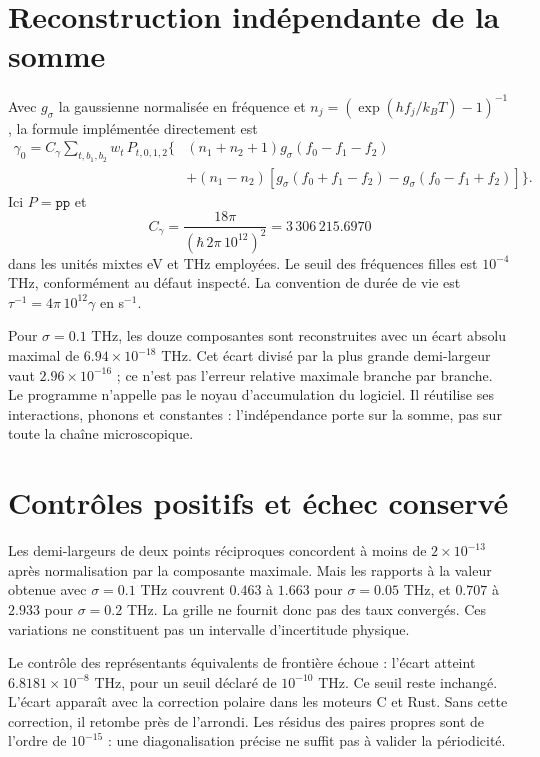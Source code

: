 \documentclass[11pt,a4paper]{article}
\begin{document}
\section{Reconstruction indépendante de la somme}
Avec $g_\sigma$ la gaussienne normalisée en fréquence et
$n_j=(\exp(hf_j/k_BT)-1)^{-1}$, la formule implémentée directement est
\[
\begin{split}
\gamma_0=C_\gamma\sum_{t,b_1,b_2}w_t\,P_{t,0,1,2}
\bigl\{&(n_1+n_2+1)g_\sigma(f_0-f_1-f_2)\\
&+(n_1-n_2)[g_\sigma(f_0+f_1-f_2)
-g_\sigma(f_0-f_1+f_2)]\bigr\}.
\end{split}
\]
Ici $P=\texttt{pp}$ et
\[
 C_\gamma=\frac{18\pi}{(\hbar\,2\pi\,10^{12})^2}
 =3\,306\,215.6970
\]
dans les unités mixtes eV et THz employées. Le seuil des fréquences
filles est $10^{-4}$ THz, conformément au défaut inspecté.
La convention de durée de vie est
$\tau^{-1}=4\pi\,10^{12}\gamma$ en s$^{-1}$.

Pour $\sigma=0.1$ THz, les douze composantes sont reconstruites avec un
écart absolu maximal de $6.94\times10^{-18}$ THz.
Cet écart divisé par la plus grande demi-largeur vaut $2.96\times10^{-16}$ ;
ce n'est pas l'erreur relative maximale branche par branche.
Le programme n'appelle pas le noyau d'accumulation du logiciel.
Il réutilise ses interactions, phonons et constantes : l'indépendance
porte sur la somme, pas sur toute la chaîne microscopique.

\section{Contrôles positifs et échec conservé}
Les demi-largeurs de deux points réciproques concordent à moins de
$2\times10^{-13}$ après normalisation par la composante maximale.
Mais les rapports à la valeur obtenue avec $\sigma=0.1$ THz couvrent
$0.463$ à $1.663$ pour $\sigma=0.05$ THz, et $0.707$ à $2.933$ pour
$\sigma=0.2$ THz. La grille ne fournit donc pas des taux convergés.
Ces variations ne constituent pas un intervalle d'incertitude physique.

Le contrôle des représentants équivalents de frontière échoue :
l'écart atteint $6.8181\times10^{-8}$ THz, pour un seuil
déclaré de $10^{-10}$ THz. Ce seuil reste inchangé.
L'écart apparaît avec la correction polaire dans les moteurs C et
Rust. Sans cette correction, il retombe près de l'arrondi.
Les résidus des paires propres sont de l'ordre de $10^{-15}$ :
une diagonalisation précise ne suffit pas à valider la périodicité.
\end{document}
